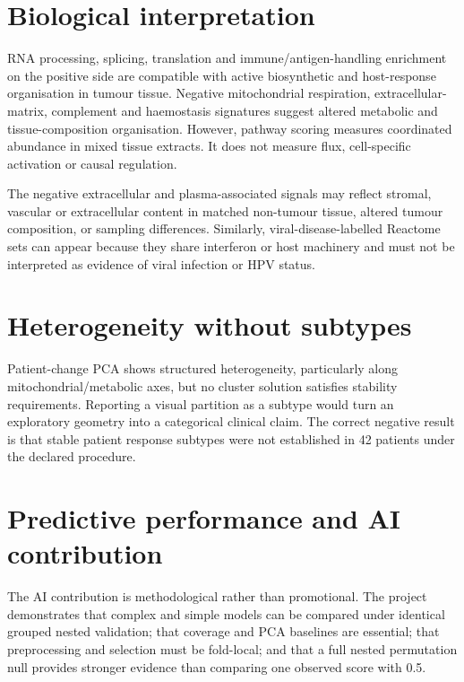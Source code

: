 \section{Biological interpretation}
\label{sec:biological_interpretation}

RNA processing, splicing, translation and immune/antigen-handling enrichment on the positive side are compatible with active biosynthetic and host-response organisation in tumour tissue. Negative mitochondrial respiration, extracellular-matrix, complement and haemostasis signatures suggest altered metabolic and tissue-composition organisation. However, pathway scoring measures coordinated abundance in mixed tissue extracts. It does not measure flux, cell-specific activation or causal regulation.

The negative extracellular and plasma-associated signals may reflect stromal, vascular or extracellular content in matched non-tumour tissue, altered tumour composition, or sampling differences. Similarly, viral-disease-labelled Reactome sets can appear because they share interferon or host machinery and must not be interpreted as evidence of viral infection or HPV status.

\section{Heterogeneity without subtypes}
\label{sec:heterogeneity_without_subtypes}

Patient-change PCA shows structured heterogeneity, particularly along mitochondrial/metabolic axes, but no cluster solution satisfies stability requirements. Reporting a \texttt{} visual partition as a subtype would turn an exploratory geometry into a categorical clinical claim. The correct negative result is that stable patient response subtypes were not established in 42 patients under the declared procedure.

\section{Predictive performance and AI contribution}
\label{sec:predictive_performance_and_ai_contribution}

The AI contribution is methodological rather than promotional. The project demonstrates that complex and simple models can be compared under identical grouped nested validation; that coverage and PCA baselines are essential; that preprocessing and selection must be fold-local; and that a full nested permutation null provides stronger evidence than comparing one observed score with 0.5.

